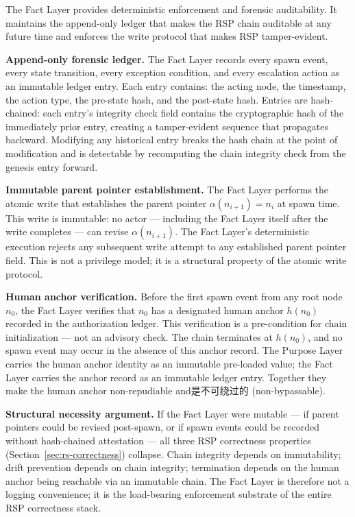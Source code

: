 The Fact Layer provides deterministic enforcement and forensic auditability. It maintains the append-only ledger that makes the RSP chain auditable at any future time and enforces the write protocol that makes RSP tamper-evident.

\medskip
\noindent\textbf{Append-only forensic ledger.} The Fact Layer records every spawn event, every state transition, every exception condition, and every escalation action as an immutable ledger entry. Each entry contains: the acting node, the timestamp, the action type, the pre-state hash, and the post-state hash. Entries are hash-chained: each entry's integrity check field contains the cryptographic hash of the immediately prior entry, creating a tamper-evident sequence that propagates backward. Modifying any historical entry breaks the hash chain at the point of modification and is detectable by recomputing the chain integrity check from the genesis entry forward.

\medskip
\noindent\textbf{Immutable parent pointer establishment.} The Fact Layer performs the atomic write that establishes the parent pointer $\alpha(n_{i+1}) = n_i$ at spawn time. This write is immutable: no actor — including the Fact Layer itself after the write completes — can revise $\alpha(n_{i+1})$. The Fact Layer's deterministic execution rejects any subsequent write attempt to any established parent pointer field. This is not a privilege model; it is a structural property of the atomic write protocol.

\medskip
\noindent\textbf{Human anchor verification.} Before the first spawn event from any root node $n_0$, the Fact Layer verifies that $n_0$ has a designated human anchor $h(n_0)$ recorded in the authorization ledger. This verification is a pre-condition for chain initialization — not an advisory check. The chain terminates at $h(n_0)$, and no spawn event may occur in the absence of this anchor record. The Purpose Layer carries the human anchor identity as an immutable pre-loaded value; the Fact Layer carries the anchor record as an immutable ledger entry. Together they make the human anchor non-repudiable and是不可绕过的 (non-bypassable).

\medskip
\noindent\textbf{Structural necessity argument.} If the Fact Layer were mutable — if parent pointers could be revised post-spawn, or if spawn events could be recorded without hash-chained attestation — all three RSP correctness properties (Section~\ref{sec:rs-correctness}) collapse. Chain integrity depends on immutability; drift prevention depends on chain integrity; termination depends on the human anchor being reachable via an immutable chain. The Fact Layer is therefore not a logging convenience; it is the load-bearing enforcement substrate of the entire RSP correctness stack.

